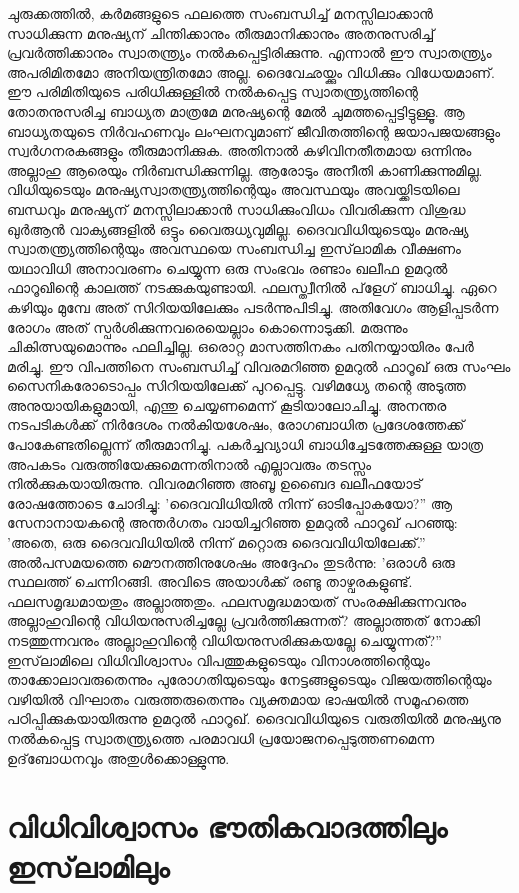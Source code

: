 ചുരുക്കത്തില്‍, കര്‍മങ്ങളുടെ ഫലത്തെ സംബന്ധിച്ച് മനസ്സിലാക്കാന്‍ സാധിക്കുന്ന മനുഷ്യന് ചിന്തിക്കാനും തീരുമാനിക്കാനും അതനുസരിച്ച് പ്രവര്‍ത്തിക്കാനും സ്വാതന്ത്യ്രം നല്‍കപ്പെട്ടിരിക്കുന്നു. എന്നാല്‍ ഈ സ്വാതന്ത്യ്രം അപരിമിതമോ അനിയന്ത്രിതമോ അല്ല. ദൈവേഛയ്ക്കും വിധിക്കും വിധേയമാണ്. ഈ പരിമിതിയുടെ പരിധിക്കുള്ളില്‍ നല്‍കപ്പെട്ട സ്വാതന്ത്യ്രത്തിന്റെ തോതനുസരിച്ച ബാധ്യത മാത്രമേ മനുഷ്യന്റെ മേല്‍ ചുമത്തപ്പെട്ടിട്ടുള്ളൂ. ആ ബാധ്യതയുടെ നിര്‍വഹണവും ലംഘനവുമാണ് ജീവിതത്തിന്റെ ജയാപജയങ്ങളും സ്വര്‍ഗനരകങ്ങളും തീരുമാനിക്കുക. അതിനാല്‍ കഴിവിനതീതമായ ഒന്നിനും അല്ലാഹു ആരെയും നിര്‍ബന്ധിക്കുന്നില്ല. ആരോടും അനീതി കാണിക്കുന്നുമില്ല. വിധിയുടെയും മനുഷ്യസ്വാതന്ത്യ്രത്തിന്റെയും അവസ്ഥയും അവയ്ക്കിടയിലെ ബന്ധവും മനുഷ്യന് മനസ്സിലാക്കാന്‍ സാധിക്കുംവിധം വിവരിക്കുന്ന വിശുദ്ധ ഖുര്‍ആന്‍ വാക്യങ്ങളില്‍ ഒട്ടും വൈരുധ്യവുമില്ല.
ദൈവവിധിയുടെയും മനുഷ്യ സ്വാതന്ത്യ്രത്തിന്റെയും അവസ്ഥയെ സംബന്ധിച്ച ഇസ്‌ലാമിക വീക്ഷണം യഥാവിധി അനാവരണം ചെയ്യുന്ന ഒരു സംഭവം രണ്ടാം ഖലീഫ ഉമറുല്‍ ഫാറൂഖിന്റെ കാലത്ത് നടക്കുകയുണ്ടായി. ഫലസ്ത്വീനില്‍ പ്‌ളേഗ് ബാധിച്ചു. ഏറെ കഴിയും മുമ്പേ അത് സിറിയയിലേക്കും പടര്‍ന്നുപിടിച്ചു. അതിവേഗം ആളിപ്പടര്‍ന്ന രോഗം അത് സ്പര്‍ശിക്കുന്നവരെയെല്ലാം കൊന്നൊടുക്കി. മരുന്നും ചികിത്സയുമൊന്നും ഫലിച്ചില്ല. ഒരൊറ്റ മാസത്തിനകം പതിനയ്യായിരം പേര്‍ മരിച്ചു. ഈ വിപത്തിനെ സംബന്ധിച്ച് വിവരമറിഞ്ഞ ഉമറുല്‍ ഫാറൂഖ് ഒരു സംഘം സൈനികരോടൊപ്പം സിറിയയിലേക്ക് പുറപ്പെട്ടു. വഴിമധ്യേ തന്റെ അടുത്ത അനുയായികളുമായി, എന്തു ചെയ്യണമെന്ന് കൂടിയാലോചിച്ചു. അനന്തര നടപടികള്‍ക്ക് നിര്‍ദേശം നല്‍കിയശേഷം, രോഗബാധിത പ്രദേശത്തേക്ക് പോകേണ്ടതില്ലെന്ന് തീരുമാനിച്ചു. പകര്‍ച്ചവ്യാധി ബാധിച്ചേടത്തേക്കുള്ള യാത്ര അപകടം വരുത്തിയേക്കുമെന്നതിനാല്‍ എല്ലാവരും തടസ്സം നില്‍ക്കുകയായിരുന്നു. വിവരമറിഞ്ഞ അബൂ ഉബൈദ ഖലീഫയോട് രോഷത്തോടെ ചോദിച്ചു: 'ദൈവവിധിയില്‍ നിന്ന് ഓടിപ്പോകയോ?'' ആ സേനാനായകന്റെ അന്തര്‍ഗതം വായിച്ചറിഞ്ഞ ഉമറുല്‍ ഫാറൂഖ് പറഞ്ഞു: 'അതെ, ഒരു ദൈവവിധിയില്‍ നിന്ന് മറ്റൊരു ദൈവവിധിയിലേക്ക്.'' അല്‍പസമയത്തെ മൌനത്തിനുശേഷം അദ്ദേഹം തുടര്‍ന്നു: 'ഒരാള്‍ ഒരു സ്ഥലത്ത് ചെന്നിറങ്ങി. അവിടെ അയാള്‍ക്ക് രണ്ടു താഴ്വരകളുണ്ട്. ഫലസമൃദ്ധമായതും അല്ലാത്തതും. ഫലസമൃദ്ധമായത് സംരക്ഷിക്കുന്നവനും അല്ലാഹുവിന്റെ വിധിയനുസരിച്ചല്ലേ പ്രവര്‍ത്തിക്കുന്നത്? അല്ലാത്തത് നോക്കി നടത്തുന്നവനും അല്ലാഹുവിന്റെ വിധിയനുസരിക്കുകയല്ലേ ചെയ്യുന്നത്?''
ഇസ്‌ലാമിലെ വിധിവിശ്വാസം വിപത്തുകളുടെയും വിനാശത്തിന്റെയും താക്കോലാവരുതെന്നും പുരോഗതിയുടെയും നേട്ടങ്ങളുടെയും വിജയത്തിന്റെയും വഴിയില്‍ വിഘാതം വരുത്തരുതെന്നും വ്യക്തമായ ഭാഷയില്‍ സമൂഹത്തെ പഠിപ്പിക്കുകയായിരുന്നു ഉമറുല്‍ ഫാറൂഖ്. ദൈവവിധിയുടെ വരുതിയില്‍ മനുഷ്യനു നല്‍കപ്പെട്ട സ്വാതന്ത്യ്രത്തെ പരമാവധി പ്രയോജനപ്പെടുത്തണമെന്ന ഉദ്‌ബോധനവും അതുള്‍ക്കൊള്ളുന്നു.
\chapter{വിധിവിശ്വാസം ഭൗതികവാദത്തിലും ഇസ്‌ലാമിലും} 
